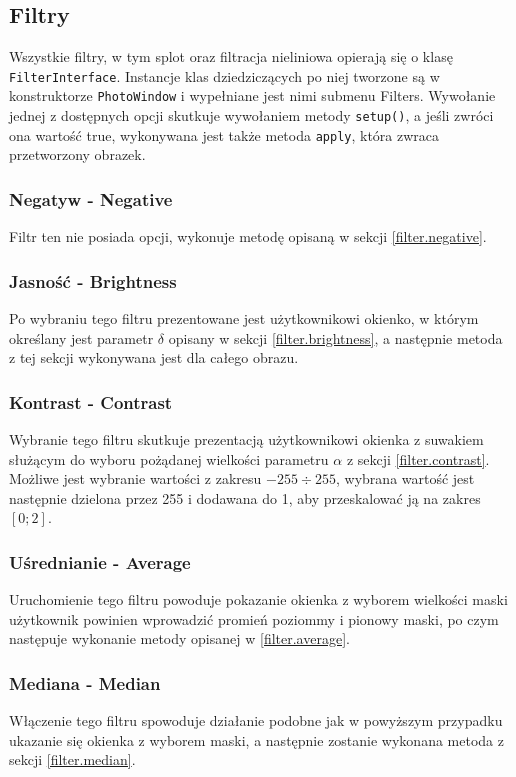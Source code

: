 \documentclass{classrep}
\begin{document}
\subsection{Filtry}
Wszystkie filtry, w tym splot oraz filtracja nieliniowa opierają się o klasę \texttt{FilterInterface}. Instancje klas dziedziczących po niej tworzone są w konstruktorze \texttt{PhotoWindow} i wypełniane jest nimi submenu Filters. Wywołanie jednej z dostępnych opcji skutkuje wywołaniem metody \texttt{setup()}, a jeśli zwróci ona wartość true, wykonywana jest także metoda \texttt{apply}, która zwraca przetworzony obrazek.

\subsubsection{Negatyw - Negative}
Filtr ten nie posiada opcji, wykonuje metodę opisaną w sekcji \ref{filter.negative}.

\subsubsection{Jasność - Brightness}
Po wybraniu tego filtru prezentowane jest użytkownikowi okienko, w którym określany jest parametr $\delta$ opisany w sekcji \ref{filter.brightness}, a następnie metoda z tej sekcji wykonywana jest dla całego obrazu.

\subsubsection{Kontrast - Contrast}
Wybranie tego filtru skutkuje prezentacją użytkownikowi okienka z suwakiem służącym do wyboru pożądanej wielkości parametru $\alpha$ z sekcji \ref{filter.contrast}. Możliwe jest wybranie wartości z zakresu $-255 \div 255$, wybrana wartość jest następnie dzielona przez 255 i dodawana do 1, aby przeskalować ją na zakres $[0; 2]$.

\subsubsection{Uśrednianie - Average}
Uruchomienie tego filtru powoduje pokazanie okienka z wyborem wielkości maski \ppauza użytkownik powinien wprowadzić promień poziommy i pionowy maski, po czym następuje wykonanie metody opisanej w \ref{filter.average}.

\subsubsection{Mediana - Median}
Włączenie tego filtru spowoduje działanie podobne jak w powyższym przypadku \ppauza ukazanie się okienka z wyborem maski, a następnie zostanie wykonana metoda z sekcji \ref{filter.median}.
\end{document}
